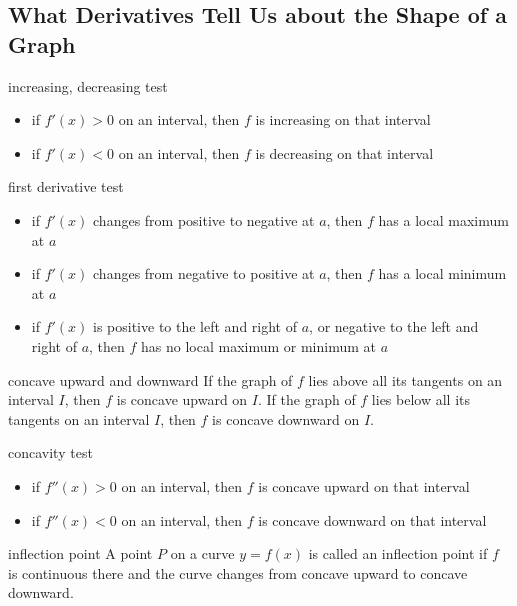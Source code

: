 \documentclass[Calculus 1 Recitation.tex]{subfiles}
\begin{document}
\subsection{What Derivatives Tell Us about the Shape of a Graph}

\begin{myleftlinebox}
	increasing, decreasing test
	\tcblower
	\begin{itemize}
		\item if $f'(x)>0$ on an interval, then $f$ is increasing on that interval
		\item if $f'(x)<0$ on an interval, then $f$ is decreasing on that interval
	\end{itemize}
\end{myleftlinebox}

\begin{myleftlinebox}
	first derivative test
	\tcblower
	\begin{itemize}
		\item if $f'(x)$ changes from positive to negative at $a$, then $f$ has a local maximum at $a$
		\item if $f'(x)$ changes from negative to positive at $a$, then $f$ has a local minimum at $a$
		\item if $f'(x)$ is positive to the left and right of $a$, or negative to the left and right of $a$, then $f$ has no local maximum or minimum at $a$
	\end{itemize}
\end{myleftlinebox}

\begin{myleftlinebox}
	concave upward and downward
	\tcblower
	If the graph of $f$ lies above all its tangents on an interval $I$, then $f$ is concave upward on $I$. If the graph of $f$ lies below all its tangents on an interval $I$, then $f$ is concave downward on $I$.
\end{myleftlinebox}

\begin{myleftlinebox}
	concavity test
	\tcblower
	\begin{itemize}
		\item if $f''(x)>0$ on an interval, then $f$ is concave upward on that interval
		\item if $f''(x)<0$ on an interval, then $f$ is concave downward on that interval
	\end{itemize}
\end{myleftlinebox}

\begin{myleftlinebox}
	inflection point
	\tcblower
	A point $P$ on a curve $y = f(x)$ is called an inflection point if $f$ is continuous there and the curve changes from concave upward to concave downward.
\end{myleftlinebox}
\end{document}
